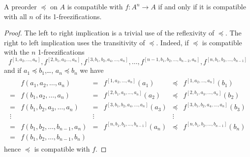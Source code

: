 \documentclass[10pt,a4paper]{amsart}
\begin{document}
\begin{lemma}\label{lem:de n a 1}
A preorder $\preceq$ on $A$ 
is compatible with $f\colon A^n\longrightarrow A$ 
if and only if 
it is compatible with all $n$ of its  1-freezifications.
\end{lemma}

\begin{proof} 
The left to right implication
is a trivial use of the reflexivity of $\preceq$. 
The right to left implication uses the transitivity of $\preceq$. 
Indeed,
if $\preceq$ is compatible with the $n$ 1-freezifications
\begin{equation*}
f^{[1,a_2,\ldots,a_{n}]},
f^{[2,b_1,a_{3}\ldots,a_{n}]},
f^{[3,b_1,b_{2},a_{4},\ldots,a_{n}]},
\ldots,
f^{[n-1,b_1,b_{2},\ldots,b_{n-2},a_{n}]},
f^{[n,b_1,b_{2},\ldots,b_{n-1}]}
\end{equation*}
and if $a_{1}\preceq b_{1}$,\ldots, $a_{n}\preceq b_{n}$
we have
\begin{align*}
\begin{array}{clclcl}
&f(a_1,a_2,\ldots,a_{n})
&=&f^{[1,a_2,\ldots,a_{n}]}(a_{1})
&\preceq& f^{[1,a_2,\ldots,a_{n}]}(b_{1})
\\
=& f(b_{1},a_2,\ldots,a_{n})
&=&f^{[2,b_{1},a_{3},\ldots,a_{n}]}(a_{2})
&\preceq& f^{[2,b_{1},a_{3},\ldots,a_{n}]}(b_{2})
\\
=& f(b_{1},b_2,a_{3},\ldots,a_{n})
&=&f^{[3,b_{1},b_{2},a_{4},\ldots,a_{n}]}(a_{3})
&\preceq& f^{[3,b_{1},b_{2},a_{4},\ldots,a_{n}]}(b_{3})
\\
\vdots& &\vdots& &\vdots&\\
=& f(b_{1},b_2,\ldots,b_{n-1},a_{n})
&=&f^{[n,b_{1},b_2,\ldots,b_{n-1}]}(a_{n})
&\preceq& f^{[n,b_{1},b_2,\ldots,b_{n-1}]}(b_{n})
\\
=& f(b_{1},b_2,\ldots,b_{n-1},b_{n})
\end{array}
\end{align*}
hence $\preceq$ is compatible with $f$. 
\end{proof}
\end{document}
